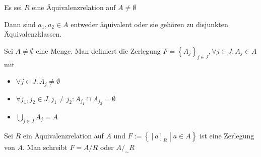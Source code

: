 \begin{corollary}
  Es sei $R$ eine Äquivalenzrelation auf $A \ne \emptyset$

  Dann sind $a_1, a_2 \in A$ entweder äquivalent oder sie gehören zu disjunkten Äquivalenzklassen.
\end{corollary}
\begin{remark}
  Sei $A \ne \emptyset$ eine Menge. Man definiert die Zerlegung $F = \left\{ A_j \right\}_{j \in J}, \forall j \in J: A_j \in A$ mit
  \begin{itemize}
  \item $\forall j \in J: A_j \ne \emptyset$
  \item $\forall j_1, j_2 \in J, j_1 \ne j_2: A_{j_1} \cap A_{j_2} = \emptyset$
  \item $\bigcup_{j \in J} A_j = A$
  \end{itemize}

  Sei $R$ ein Äquivalenzrelation auf $A$ und $F:= \left\{ [a]_R \middle| a \in A \right\}$ ist eine Zerlegung von $A$. Man schreibt $F = A / R$ oder $A /_{\sim} R$\index[sym]{$/$}\index[sym]{$/_{\sim}$}
\end{remark}